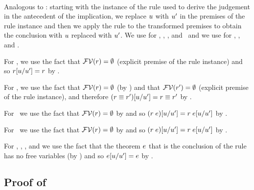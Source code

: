 \begin{bycase}
\Case{\restrules}\\
Analogous to \Rtbool: starting with the instance of the rule used to derive
the judgement in the antecedent of the implication, we replace $u$ with
$u'$ in the premises of the rule instance and then we apply the rule to
the transformed premises to obtain the conclusion with $u$ replaced with
$u'$. We use  for \Rtvar, \Rtinst, \Rtedef, and
\Reop\ and we use  for \Reif, \Rthifsbs, and \Rthif.

For \Rtsub, we use the fact that $\mathcal{FV}(r)=\emptyset$ (explicit premise
of the rule instance) and so $r[u/u']=r$ by
.


For \Rterestr, we use the fact that $\mathcal{FV}(r)=\emptyset$ (by
) and that $\mathcal{FV}(r')=\emptyset$
(explicit premise of the rule instance), and therefore
$(r\equiv r')[u/u']=r\equiv r'$ by
.

For \Resub\ we use the fact that $\mathcal{FV}(r)=\emptyset$ by
 and so
$(r\;e)[u/u']=r\;e[u/u']$ by
.

For \Rthsub\ we use the fact that $\mathcal{FV}(r)=\emptyset$ by
 and so
$(r\;e)[u/u']=r\;e[u/u']$ by
.

For \Rthbool, \Rthext, \Rthrec,
and \Rthprojsub
we use the fact that the theorem $e$ that is the conclusion of the rule
has no free variables (by ) and so
$e[u/u']=e$ by .

\end{bycase}



\subsection*{Proof of }

